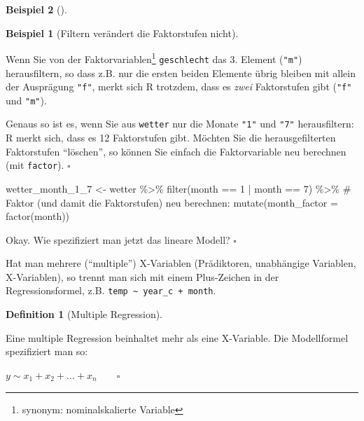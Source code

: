 \documentclass[
  letterpaper,
]{scrbook}
\newenvironment{Shaded}{\begin{snugshade}}{\end{snugshade}}
\newcommand{\AttributeTok}[1]{\textcolor[rgb]{0.40,0.45,0.13}{#1}}
\newcommand{\CommentTok}[1]{\textcolor[rgb]{0.37,0.37,0.37}{#1}}
\newcommand{\DecValTok}[1]{\textcolor[rgb]{0.68,0.00,0.00}{#1}}
\newcommand{\FunctionTok}[1]{\textcolor[rgb]{0.28,0.35,0.67}{#1}}
\newcommand{\NormalTok}[1]{\textcolor[rgb]{0.00,0.23,0.31}{#1}}
\newcommand{\OtherTok}[1]{\textcolor[rgb]{0.00,0.23,0.31}{#1}}
\newcommand{\SpecialCharTok}[1]{\textcolor[rgb]{0.37,0.37,0.37}{#1}}
\theoremstyle{definition}
\theoremstyle{definition}
\newtheorem{example}{Beispiel}[chapter]
\theoremstyle{definition}
\newtheorem{definition}{Definition}[chapter]
\theoremstyle{remark}
\begin{document}
\begin{example}[]
\begin{example}[Filtern verändert die Faktorstufen
nicht]\protect\hypertarget{exm-factor2}{}\label{exm-factor2}

Wenn Sie von der Faktorvariablen\footnote{synonym: nominalskalierte
  Variable} \texttt{geschlecht} das 3. Element (\texttt{"m"})
herausfiltern, so dass z.B. nur die ersten beiden Elemente übrig bleiben
mit allein der Ausprägung \texttt{"f"}, merkt sich R trotzdem, dass es
\emph{zwei} Faktorstufen gibt (\texttt{"f"} und \texttt{"m"}).

Genaus so ist es, wenn Sie aus \texttt{wetter} nur die Monate
\texttt{"1"} und \texttt{"7"} herausfiltern: R merkt sich, dass es 12
Faktorstufen gibt. Möchten Sie die herausgefilterten Faktorstufen
\enquote{löschen}, so können Sie einfach die Faktorvariable neu
berechnen (mit \texttt{factor}). \(\square\)

\end{example}

\begin{Shaded}
\begin{Highlighting}[]
\NormalTok{wetter\_month\_1\_7 }\OtherTok{\textless{}{-}}
\NormalTok{  wetter }\SpecialCharTok{\%\textgreater{}\%} 
  \FunctionTok{filter}\NormalTok{(month }\SpecialCharTok{==} \DecValTok{1}  \SpecialCharTok{|}\NormalTok{ month }\SpecialCharTok{==} \DecValTok{7}\NormalTok{) }\SpecialCharTok{\%\textgreater{}\%} 
  \CommentTok{\# Faktor (und damit die Faktorstufen) neu berechnen:}
  \FunctionTok{mutate}\NormalTok{(}\AttributeTok{month\_factor =} \FunctionTok{factor}\NormalTok{(month))}
\end{Highlighting}
\end{Shaded}

Okay. Wie spezifiziert man jetzt das lineare Modell? \(\square\)

\end{example}

Hat man mehrere (\enquote{multiple}) X-Variablen (Prädiktoren,
unabhängige Variablen, X-Variablen), so trennt man sich mit einem
Plus-Zeichen in der Regressionsformel, z.B.
\texttt{temp\ \textasciitilde{}\ year\_c\ +\ month}.

\begin{definition}[Multiple
Regression]\protect\hypertarget{def-mult-regr}{}\label{def-mult-regr}

Eine multiple Regression beinhaltet mehr als eine X-Variable. Die
Modellformel spezifiziert man so:

\(y \sim x_1 + x_2 + \ldots + x_n \qquad \square\)

\end{definition}
\end{document}
